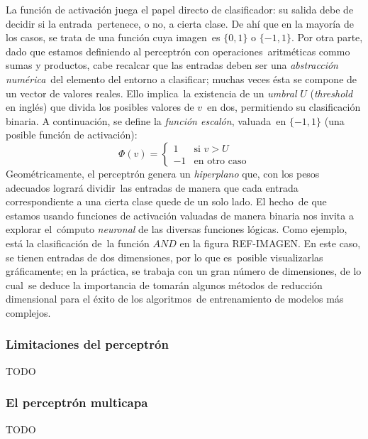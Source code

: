 La función de activación juega el papel directo de clasificador: su salida debe de decidir si la entrada\
pertenece, o no, a cierta clase. De ahí que en la mayoría de los casos, se trata de una función cuya imagen\
es $\{0,1\}$ o $\{-1,1\}$. Por otra parte, dado que estamos definiendo al perceptrón con operaciones\
aritméticas commo sumas y productos, cabe recalcar que las entradas deben ser una \emph{abstracción numérica}\
del elemento del entorno a clasificar; muchas veces ésta se compone de un vector de valores reales. Ello implica\
la existencia de un \emph{umbral} $U$ (\emph{threshold} en inglés) que divida los posibles valores de $v$\
en dos, permitiendo su clasificación binaria. A continuación, se define la \emph{función escalón}, valuada\
en $\{-1,1\}$ (una posible función de activación):
\begin{equation}
  \Phi(v) =
  \begin{cases}
    1 & \text{si } v > U\\
    -1 & \text{en otro caso}
  \end{cases}
\end{equation}
Geométricamente, el perceptrón genera un \emph{hiperplano} que, con los pesos adecuados logrará dividir\
las entradas de manera que cada entrada correspondiente a una cierta clase quede de un solo lado. El hecho\
de que estamos usando funciones de activación valuadas de manera binaria nos invita a explorar el\
cómputo \emph{neuronal} de las diversas funciones lógicas. Como ejemplo, está la clasificación de\
la función $AND$ en la figura REF-IMAGEN. En este caso, se tienen entradas de dos dimensiones, por lo que es\
posible visualizarlas gráficamente; en la práctica, se trabaja con un gran número de dimensiones, de lo cual\
se deduce la importancia de tomarán algunos métodos de reducción dimensional para el éxito de los algoritmos\
de entrenamiento de modelos más complejos.

\subsubsection*{Limitaciones del perceptrón}

TODO


\subsubsection*{El perceptrón multicapa}

TODO
